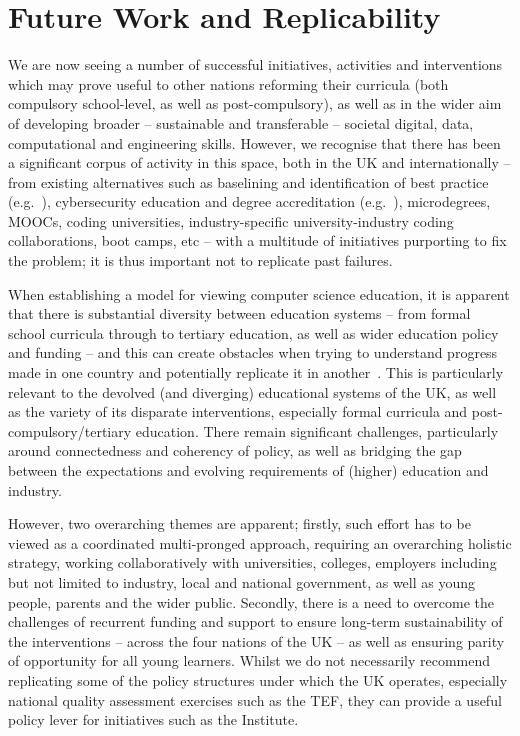 \documentclass[conference]{IEEEtran}
\begin{document}
\section{Future Work and Replicability}\label{concl}

We are now seeing a number of successful initiatives, activities and
interventions which may prove useful to other nations reforming their
curricula (both compulsory school-level, as well as post-compulsory),
as well as in the wider aim of developing broader -- sustainable and
transferable -- societal digital, data, computational and engineering
skills. However, we recognise that there has been a significant corpus
of activity in this space, both in the UK and internationally -- from
existing alternatives such as baselining and identification of best
practice (e.g.~\cite{murphy-et-al:programming2017}), cybersecurity
education and degree accreditation (e.g.~\cite{crick-et-al:fie2019}),
microdegrees, MOOCs, coding universities, industry-specific
university-industry coding collaborations, boot camps, etc -- with a
multitude of initiatives purporting to fix the problem; it is thus
important not to replicate past failures.

When establishing a model for viewing computer science education, it
is apparent that there is substantial diversity between education
systems -- from formal school curricula through to tertiary education,
as well as wider education policy and funding -- and this can create
obstacles when trying to understand progress made in one country and
potentially replicate it in another~\cite{hubwieser:2013}. This is
particularly relevant to the devolved (and diverging) educational
systems of the UK, as well as the variety of its disparate
interventions, especially formal curricula and
post-compulsory/tertiary education.  There remain significant
challenges, particularly around connectedness and coherency of policy,
as well as bridging the gap between the expectations and evolving
requirements of (higher) education and industry.

However, two overarching themes are apparent; firstly, such effort has
to be viewed as a coordinated multi-pronged approach, requiring an
overarching holistic strategy, working collaboratively with
universities, colleges, employers including but not limited to
industry, local and national government, as well as young people,
parents and the wider public. Secondly, there is a need to overcome
the challenges of recurrent funding and support to ensure long-term
sustainability of the interventions -- across the four nations of the
UK -- as well as ensuring parity of opportunity for all young
learners. Whilst we do not necessarily recommend replicating some of
the policy structures under which the UK operates, especially national
quality assessment exercises such as the TEF, they can provide a
useful policy lever for initiatives such as the Institute.
\end{document}

